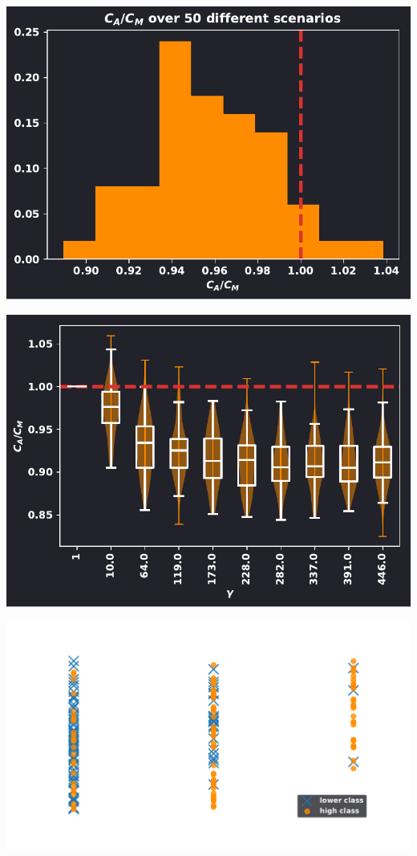 \documentclass{beamer}
\begin{document}
\begin{frame}[fragile]
    \begin{center}
        \includegraphics[width=.7\textwidth]{static/ratio_one_to_twenty.pdf}
    \end{center}
\end{frame}

\begin{frame}[fragile]
    \begin{center}
    \includegraphics[width=.7\textwidth]{static/ratio_over_gammas.pdf}
    \end{center}
\end{frame}

\begin{frame}
        \centering
\end{frame}

\begin{frame}[fragile]
    \begin{center}
    \includegraphics[width=.7\textwidth]{static/exit_levels.pdf}
    \end{center}
\end{frame}
\end{document}
